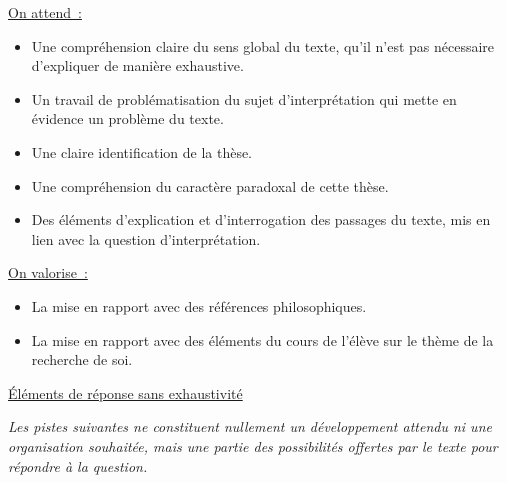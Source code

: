{\underline{On attend~:}
\begin{itemize}
\item Une compréhension claire du sens global du texte, qu'il n'est pas nécessaire d'expliquer
de manière exhaustive.
\item Un travail de problématisation du sujet d'interprétation qui mette en évidence un problème
du texte.
\item Une claire identification de la thèse.
\item Une compréhension du caractère paradoxal de cette thèse.
\item Des éléments d'explication et d'interrogation des passages du texte, mis en lien avec la
question d'interprétation.
\end{itemize}

\underline{On valorise~:}
\begin{itemize}
\item La mise en rapport avec des références philosophiques.
\item La mise en rapport avec des éléments du cours de l'élève sur le thème de la recherche
de soi.
\end{itemize}

\underline{Éléments de réponse sans exhaustivité}

\textit{Les pistes suivantes ne constituent nullement un développement attendu ni une organisation
souhaitée, mais une partie des possibilités offertes par le texte pour répondre à la question.}

}
